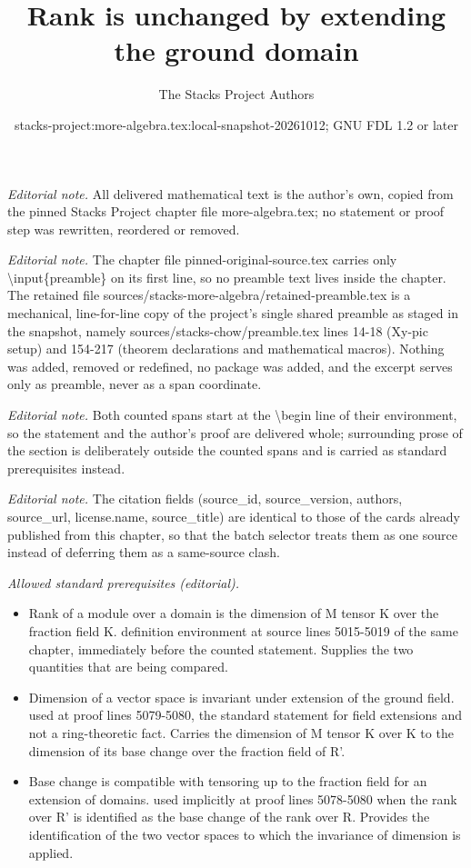 \documentclass[10pt,a4paper]{amsart}
\title{Rank is unchanged by extending the ground domain}
\author{The Stacks Project Authors}
\date{stacks-project:more-algebra.tex:local-snapshot-20261012; GNU FDL 1.2 or later}
\theoremstyle{plain}
\theoremstyle{definition}
\theoremstyle{remark}
\numberwithin{equation}{subsection}
\begin{document}
\maketitle
\setcounter{subsection}{1}
\noindent\textit{Editorial note.} All delivered mathematical text is the author's own, copied from the pinned Stacks Project chapter file more-algebra.tex; no statement or proof step was rewritten, reordered or removed.\par\medskip
\noindent\textit{Editorial note.} The chapter file pinned-original-source.tex carries only \textbackslash{}input\{preamble\} on its first line, so no preamble text lives inside the chapter. The retained file sources/stacks-more-algebra/retained-preamble.tex is a mechanical, line-for-line copy of the project's single shared preamble as staged in the snapshot, namely sources/stacks-chow/preamble.tex lines 14-18 (Xy-pic setup) and 154-217 (theorem declarations and mathematical macros). Nothing was added, removed or redefined, no package was added, and the excerpt serves only as preamble, never as a span coordinate.\par\medskip
\noindent\textit{Editorial note.} Both counted spans start at the \textbackslash{}begin line of their environment, so the statement and the author's proof are delivered whole; surrounding prose of the section is deliberately outside the counted spans and is carried as standard prerequisites instead.\par\medskip
\noindent\textit{Editorial note.} The citation fields (source\_id, source\_version, authors, source\_url, license.name, source\_title) are identical to those of the cards already published from this chapter, so that the batch selector treats them as one source instead of deferring them as a same-source clash.\par\medskip
\noindent\textit{Allowed standard prerequisites (editorial).}\begin{itemize}
\item Rank of a module over a domain is the dimension of M tensor K over the fraction field K. definition environment at source lines 5015-5019 of the same chapter, immediately before the counted statement. Supplies the two quantities that are being compared.
\item Dimension of a vector space is invariant under extension of the ground field. used at proof lines 5079-5080, the standard statement for field extensions and not a ring-theoretic fact. Carries the dimension of M tensor K over K to the dimension of its base change over the fraction field of R'.
\item Base change is compatible with tensoring up to the fraction field for an extension of domains. used implicitly at proof lines 5078-5080 when the rank over R' is identified as the base change of the rank over R. Provides the identification of the two vector spaces to which the invariance of dimension is applied.
\end{itemize}\medskip
\end{document}
